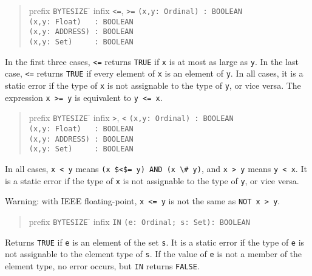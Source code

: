 \documentclass[10pt]{article}
\begin{document}
\begin{quote}
  \begin{tabbing}
    prefix \= \verb|BYTESIZE| \= \kill
    infix  \> \verb|<=|, \verb|>=| \> \verb|(x,y: Ordinal) : BOOLEAN| \\
           \>                      \> \verb|(x,y: Float)   : BOOLEAN| \\
           \>                      \> \verb|(x,y: ADDRESS) : BOOLEAN| \\
           \>                      \> \verb|(x,y: Set)     : BOOLEAN|
  \end{tabbing}
\end{quote}
In the first three cases, \verb|<=| returns \verb|TRUE| if \verb|x| is at most
as large as \verb|y|.  In the last case, \verb|<=| returns \verb|TRUE| if
every element of \verb|x| is an element of \verb|y|.  In all cases, it is a
static error if the type of \verb|x| is not assignable to the type of
\verb|y|, or vice versa.  The expression \verb|x >= y| is equivalent to
\verb|y <= x|.

\begin{quote}
  \begin{tabbing}
    prefix \= \verb|BYTESIZE| \= \kill
    infix  \> \verb|>|, \verb|<| \> \verb|(x,y: Ordinal) : BOOLEAN| \\
           \>                    \> \verb|(x,y: Float)   : BOOLEAN| \\
           \>                    \> \verb|(x,y: ADDRESS) : BOOLEAN| \\
           \>                    \> \verb|(x,y: Set)     : BOOLEAN|
  \end{tabbing}
\end{quote}
In all cases, \verb|x < y| means \verb|(x $<$= y) AND (x \# y)|, and
\verb|x > y| means \verb|y < x|.  It is a static error if the type of \verb|x|
is not assignable to the type of \verb|y|, or vice versa.

Warning: with IEEE floating-point, \verb|x <= y| is not the same as
\verb|NOT x > y|.

\begin{quote}
  \begin{tabbing}
    prefix \= \verb|BYTESIZE| \= \kill
    infix  \> \verb|IN| \> \verb|(e: Ordinal; s: Set): BOOLEAN|
  \end{tabbing}
\end{quote}
Returns \verb|TRUE| if \verb|e| is an element of the set \verb|s|.  It is a
static error if the type of \verb|e| is not assignable to the element type of
\verb|s|.  If the value of \verb|e| is not a member of the element type, no
error occurs, but \verb|IN| returns \verb|FALSE|.
\end{document}

